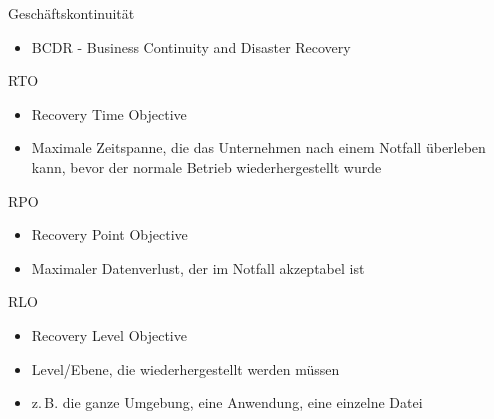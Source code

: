 

\begin{flashcard}[Definition]{Geschäftskontinuität}
  \begin{itemize}
    \item BCDR - Business Continuity and Disaster Recovery
  \end{itemize}
\end{flashcard}

\begin{flashcard}[Definition]{RTO}
  \begin{itemize}
    \item Recovery Time Objective
    \item Maximale Zeitspanne, die das Unternehmen nach einem Notfall überleben kann, bevor der normale Betrieb wiederhergestellt wurde
  \end{itemize}
\end{flashcard}

\begin{flashcard}[Definition]{RPO}
  \begin{itemize}
    \item Recovery Point Objective
    \item Maximaler Datenverlust, der im Notfall akzeptabel ist
  \end{itemize}
\end{flashcard}

\begin{flashcard}[Definition]{RLO}
  \begin{itemize}
    \item Recovery Level Objective
    \item Level/Ebene, die wiederhergestellt werden müssen
    \item z.\,B. die ganze Umgebung, eine Anwendung, eine einzelne Datei
  \end{itemize}
\end{flashcard}

